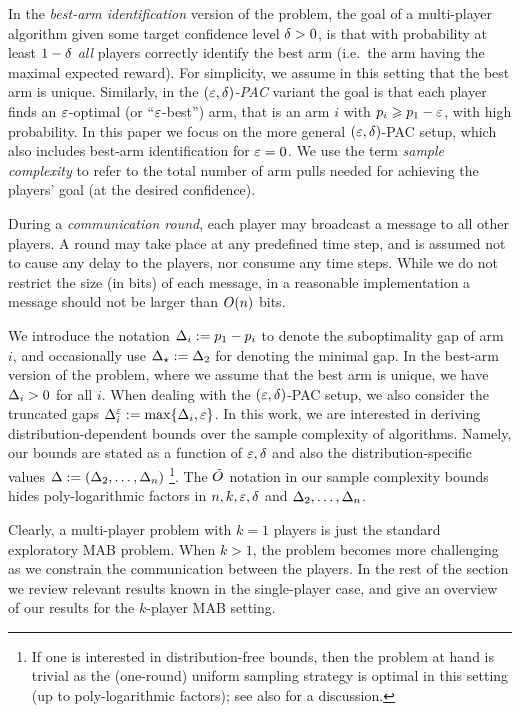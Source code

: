 \documentclass{article}
\begin{document}
In the \emph{best-arm identification} version of the problem, the goal of a multi-player algorithm given some target confidence level $\delta>0$, is that with probability at least $1-\delta$ \emph{all} players correctly identify the best arm (i.e.~the arm having the maximal expected reward).
For simplicity, we assume in this setting that the best arm is unique.
Similarly, in the \emph{$(\varepsilon,\delta)$-PAC} variant the goal is that each player finds an $\varepsilon$-optimal (or ``$\varepsilon$-best'') arm, that is an arm $i$ with $p_i \geqslant p_1 - \varepsilon$, with high probability.
In this paper we focus on the more general $(\varepsilon,\delta)$-PAC setup, which also includes best-arm identification for $\varepsilon=0$. 
We use the term \emph{sample complexity} to refer to the total number of arm pulls needed for achieving the players' goal (at the desired confidence).

During a \emph{communication round}, each player may broadcast a message to all other players.
A round may take place at any predefined time step, and is assumed not to cause
any delay to the players, nor consume any time steps.
While we do not restrict the size (in bits) of each message, in a reasonable implementation a message should not be larger than $O(n)$ bits.

We introduce the notation $\Delta_i := p_1 - p_i$ to denote the suboptimality gap of arm $i$, and occasionally use $\Delta_{\star} := \Delta_2$ for denoting the minimal gap. In the best-arm version of the problem, where we assume that the best arm is unique, we have $\Delta_i > 0$ for all $i$.
When dealing with the $(\varepsilon,\delta)$-PAC setup, we also consider the truncated gaps $\Delta^{\varepsilon}_i := \max\{\Delta_i,\varepsilon\}$.
In this work, we are interested in deriving distribution-dependent bounds over the sample complexity of algorithms. Namely, our bounds are stated as a function of $\varepsilon,\delta$ and also the distribution-specific values  $\Delta := (\Delta_2,\ldots,\Delta_n)$%
\footnote{If one is interested in distribution-free bounds, then the problem at hand is trivial as the (one-round) uniform sampling strategy is optimal in this setting (up to poly-logarithmic factors); see also \cite{mannor04} for a discussion.}. 
The $\tilde{O}$ notation in our sample complexity bounds hides poly-logarithmic factors in $n,k,\varepsilon,\delta$ and $\Delta_2,\ldots,\Delta_n$.

Clearly, a multi-player problem with $k=1$ players is just the standard exploratory MAB problem.
When $k > 1$, the problem becomes more challenging as we constrain the communication between the players.
In the rest of the section we review relevant results known in the single-player case, and give an overview of our results for the $k$-player MAB setting.
\end{document}
